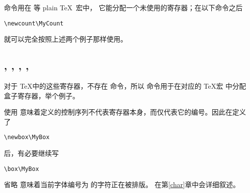 \documentclass{book}
\begin{document}
 命令用在  等 plain \TeX\ 宏中，
它能分配一个未使用的寄存器；在以下命令之后
\begin{verbatim}
\newcount\MyCount
\end{verbatim}
 就可以完全按照上述两个例子那样使用。

\subsection{, , , , }

对于 \TeX 中的这些寄存器，不存在  命令，所以  命令用于在对应的 \TeX 宏  中分配盒子寄存器，举个例子。

使用  意味着定义的控制序列不代表寄存器本身，而仅代表它的编号。因此在定义了
\begin{verbatim}
\newbox\MyBox
\end{verbatim}
后，有必要继续写
\begin{verbatim}
\box\MyBox
\end{verbatim}
省略  意味着当前字体编号为  的字符正在被排版。
 在第\ref{char}章中会详细叙述。
\end{document}

